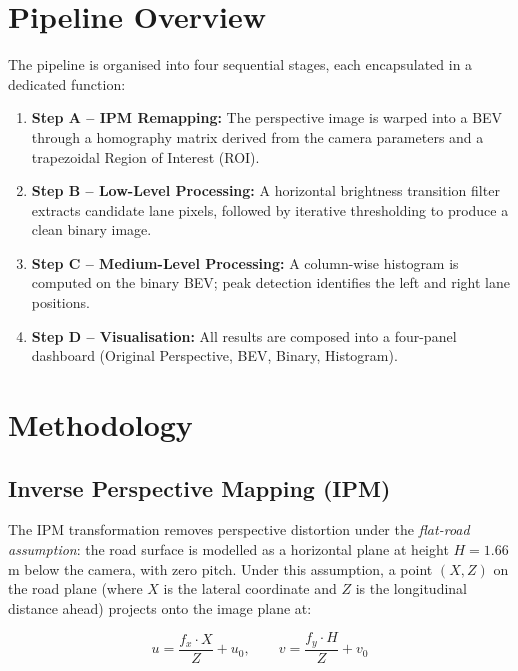 \documentclass[11pt,a4paper]{article}
\begin{document}
\section{Pipeline Overview}

The pipeline is organised into four sequential stages, each encapsulated in a dedicated function:

\begin{enumerate}
    \item \textbf{Step A -- IPM Remapping:} The perspective image is warped into a BEV through a homography matrix derived from the camera parameters and a trapezoidal Region of Interest (ROI).
    \item \textbf{Step B -- Low-Level Processing:} A horizontal brightness transition filter extracts candidate lane pixels, followed by iterative thresholding to produce a clean binary image.
    \item \textbf{Step C -- Medium-Level Processing:} A column-wise histogram is computed on the binary BEV; peak detection identifies the left and right lane positions.
    \item \textbf{Step D -- Visualisation:} All results are composed into a four-panel dashboard (Original Perspective, BEV, Binary, Histogram).
\end{enumerate}


\section{Methodology}

\subsection{Inverse Perspective Mapping (IPM)}
\label{sec:ipm}

The IPM transformation removes perspective distortion under the \emph{flat-road assumption}: the road surface is modelled as a horizontal plane at height $H = 1.66$\,m below the camera, with zero pitch. Under this assumption, a point $(X, Z)$ on the road plane (where $X$ is the lateral coordinate and $Z$ is the longitudinal distance ahead) projects onto the image plane at:

\begin{equation}
    u = \frac{f_x \cdot X}{Z} + u_0, \qquad
    v = \frac{f_y \cdot H}{Z} + v_0
    \label{eq:projection}
\end{equation}
\end{document}
